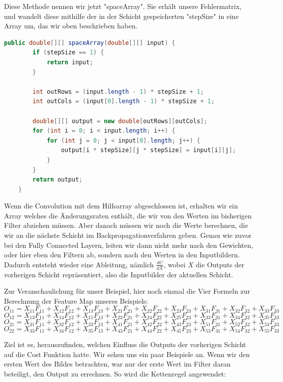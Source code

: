 \documentclass[12pt]{article}
\begin{document}
Diese Methode nennen wir jetzt "spaceArray". Sie erhält unsere Fehlermatrix, und wandelt diese mithilfe der in der Schicht gespeicherten "stepSize" in eine Array um, das wir oben beschrieben haben.

\begin{lstlisting}[language=Java]
    public double[][] spaceArray(double[][] input) {
        if (stepSize == 1) {
            return input;
        }

        int outRows = (input.length - 1) * stepSize + 1;
        int outCols = (input[0].length - 1) * stepSize + 1;

        double[][] output = new double[outRows][outCols];
        for (int i = 0; i < input.length; i++) {
            for (int j = 0; j < input[0].length; j++) {
                output[i * stepSize][j * stepSize] = input[i][j];
            }
        }
        return output;
    }
\end{lstlisting}

Wenn die Convolution mit dem Hilfsarray abgeschlossen ist, erhalten wir ein Array welches die Änderungsraten enthält, die wir von den Werten im bisherigen Filter abziehen müssen.
Aber danach müssen wir noch die Werte berechnen, die wir an die nächste Schicht im Backpropagationverfahren geben. Genau wie zuvor bei den Fully Connected Layern, leiten wir dann nicht mehr nach den Gewichten, oder hier eben den Filtern ab, sondern nach den Werten in den Inputbildern. Dadurch entsteht wieder eine Ableitung, nämlich $\frac {dC} {dX}$, wobei $X$ die Outputs der vorherigen Schicht repräsentiert, also die Inputbilder der aktuellen Schicht.

Zur Veranschaulichung für unser Beispiel, hier noch einmal die Vier Formeln zur Berechnung der Feature Map unseres Beispiels:
$$O_{11} = X_{11}F_{11}+X_{12}F_{12}+X_{13}F_{13}+X_{21}F_{21}+X_{22}F_{22}+X_{23}F_{23}+X_{31}F_{31}+X_{32}F_{32}+X_{33}F_{33}$$
$$O_{12} = X_{13}F_{11}+X_{14}F_{12}+X_{15}F_{13}+X_{23}F_{21}+X_{24}F_{22}+X_{25}F_{23}+X_{33}F_{31}+X_{34}F_{32}+X_{35}F_{33}$$
$$O_{21} = X_{31}F_{11}+X_{32}F_{12}+X_{33}F_{13}+X_{41}F_{21}+X_{42}F_{22}+X_{43}F_{23}+X_{51}F_{31}+X_{52}F_{32}+X_{53}F_{33}$$
$$O_{22} = X_{33}F_{11}+X_{34}F_{12}+X_{35}F_{13}+X_{43}F_{21}+X_{44}F_{22}+X_{45}F_{23}+X_{53}F_{31}+X_{54}F_{32}+X_{55}F_{33}$$

Ziel ist es, herauszufinden, welchen Einfluss die Outputs der vorherigen Schicht auf die Cost Funktion hatte.
Wir sehen uns ein paar Beispiele an. Wenn wir den ersten Wert des Bildes betrachten, war nur der erste Wert im Filter daran beteiligt, den Output zu errechnen. So wird die Kettenregel angewendet:
\end{document}
